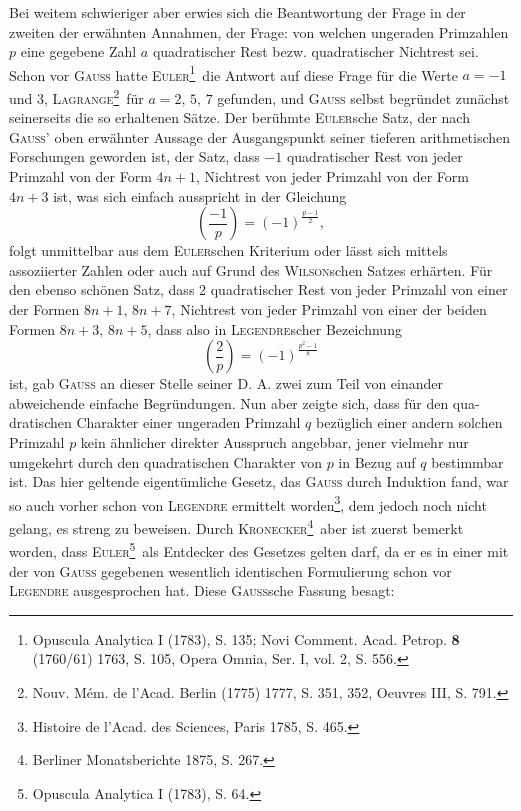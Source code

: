 Bei weitem schwieriger aber erwies sich die Beantwortung der Frage in der zweiten der erwähnten Annahmen, der Frage: von welchen ungeraden Primzahlen \(p\) eine gegebene Zahl \(a\) quadratischer Rest bezw. quadratischer Nichtrest sei. Schon vor \textsc{Gauss} hatte \textsc{Euler}\begingroup\renewcommand{\thefootnote}{***)}\footnote{Opuscula Analytica I (1783), S. 135; Novi Comment. Acad. Petrop. \textbf{8} (1760/61) 1763, S. 105, Opera Omnia, Ser. I, vol. 2, S. 556.}\endgroup\ die Antwort auf diese Frage für die Werte \(a=-1\) und 3, \textsc{Lagrange}\begingroup\renewcommand{\thefootnote}{†)}\footnote{Nouv. Mém. de l’Acad. Berlin (1775) 1777, S. 351, 352, Oeuvres III, S. 791.}\endgroup\ für \(a=2,\,5,\,7\) gefunden, und \textsc{Gauss} selbst begründet zunächst seinerseits die so erhaltenen Sätze. Der berühmte \textsc{Euler}sche Satz, der nach \textsc{Gauss}’ oben erwähnter Aussage der Ausgangspunkt seiner tieferen arithmetischen Forschungen geworden ist, der Satz, dass \(-1\) quadratischer Rest von jeder Primzahl von der Form \(4n+1\), Nichtrest von jeder Primzahl von der Form \(4n+3\) ist, was sich einfach ausspricht in der Gleichung
\[
\left(\frac{-1}{p}\right)=(-1)^{\frac{p-1}{2}},
\]
folgt unmittelbar aus dem \textsc{Euler}schen Kriterium oder lässt sich mittels assoziierter Zahlen oder auch auf Grund des \textsc{Wilson}schen Satzes erhärten. Für den ebenso schönen Satz, dass 2 quadratischer Rest von jeder Primzahl von einer der Formen \(8n+1,\,8n+7\), Nichtrest von jeder Primzahl von einer der beiden Formen \(8n+3,\,8n+5\), dass also in \textsc{Legendre}scher Bezeichnung
\[
\left(\frac{2}{p}\right)=(-1)^{\frac{p^2-1}{8}}
\]
ist, gab \textsc{Gauss} an dieser Stelle seiner D. A. zwei zum Teil von einander abweichende einfache Begründungen. Nun aber zeigte sich, dass für den qua-\newpage
{}
\noindent dratischen Charakter einer ungeraden Primzahl \(q\) bezüglich einer andern solchen Primzahl \(p\) kein ähnlicher direkter Ausspruch angebbar, jener vielmehr nur umgekehrt durch den quadratischen Charakter von \(p\) in Bezug auf \(q\) bestimmbar ist. Das hier geltende eigentümliche Gesetz, das \textsc{Gauss} durch Induktion fand, war so auch vorher schon von \textsc{Legendre} ermittelt worden\footnote{Histoire de l’Acad. des Sciences, Paris 1785, S. 465.}, dem jedoch noch nicht gelang, es streng zu beweisen. Durch \textsc{Kronecker}\begingroup\renewcommand{\thefootnote}{**)}\footnote{Berliner Monatsberichte 1875, S. 267.}\endgroup\ aber ist zuerst bemerkt worden, dass \textsc{Euler}\begingroup\renewcommand{\thefootnote}{***)}\footnote{Opuscula Analytica I (1783), S. 64.}\endgroup\ als Entdecker des Gesetzes gelten darf, da er es in einer mit der von \textsc{Gauss} gegebenen wesentlich identischen Formulierung schon vor \textsc{Legendre} ausgesprochen hat. Diese \textsc{Gauss}sche Fassung besagt:


